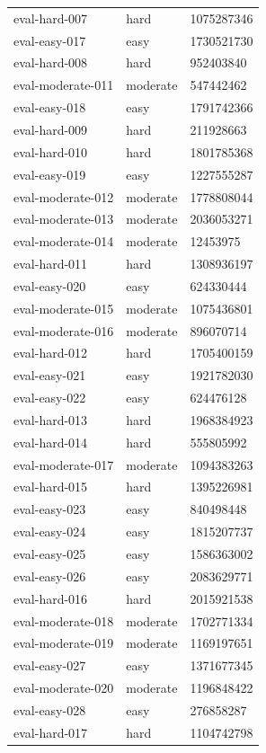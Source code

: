 \begin{tabular}{lll}
eval-hard-007 & hard & 1075287346 \\
eval-easy-017 & easy & 1730521730 \\
eval-hard-008 & hard & 952403840 \\
eval-moderate-011 & moderate & 547442462 \\
eval-easy-018 & easy & 1791742366 \\
eval-hard-009 & hard & 211928663 \\
eval-hard-010 & hard & 1801785368 \\
eval-easy-019 & easy & 1227555287 \\
eval-moderate-012 & moderate & 1778808044 \\
eval-moderate-013 & moderate & 2036053271 \\
eval-moderate-014 & moderate & 12453975 \\
eval-hard-011 & hard & 1308936197 \\
eval-easy-020 & easy & 624330444 \\
eval-moderate-015 & moderate & 1075436801 \\
eval-moderate-016 & moderate & 896070714 \\
eval-hard-012 & hard & 1705400159 \\
eval-easy-021 & easy & 1921782030 \\
eval-easy-022 & easy & 624476128 \\
eval-hard-013 & hard & 1968384923 \\
eval-hard-014 & hard & 555805992 \\
eval-moderate-017 & moderate & 1094383263 \\
eval-hard-015 & hard & 1395226981 \\
eval-easy-023 & easy & 840498448 \\
eval-easy-024 & easy & 1815207737 \\
eval-easy-025 & easy & 1586363002 \\
eval-easy-026 & easy & 2083629771 \\
eval-hard-016 & hard & 2015921538 \\
eval-moderate-018 & moderate & 1702771334 \\
eval-moderate-019 & moderate & 1169197651 \\
eval-easy-027 & easy & 1371677345 \\
eval-moderate-020 & moderate & 1196848422 \\
eval-easy-028 & easy & 276858287 \\
eval-hard-017 & hard & 1104742798 \\

\end{tabular}
